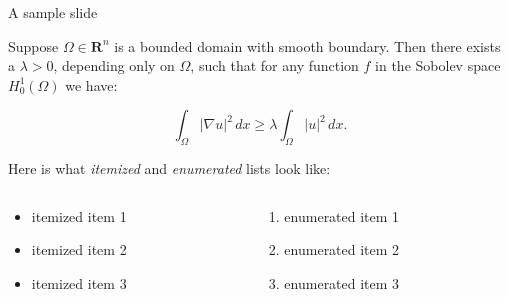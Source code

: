 \documentclass{beamer}
\begin{document}
\begin{frame}{A sample slide}

\begin{theorem}
Suppose $\Omega\in\mathbf{R}^n$ is a bounded domain with smooth
boundary.  Then there exists a $\lambda>0$, depending only on
$\Omega$, such that for any function $f$ in the Sobolev space
$H^1_0(\Omega)$ we have:

\[
  \int_\Omega |\nabla u|^2 \,dx \ge 
  \lambda \int_\Omega |u|^2 \,dx .
\]
\end{theorem}

Here is what \emph{itemized} and \emph{enumerated} lists look like:

\begin{columns}
  \begin{column}{0.45\textwidth}
  \begin{itemize}
    \item itemized item 1
    \item itemized item 2
    \item itemized item 3
  \end{itemize}
  \end{column}

  \begin{column}{0.45\textwidth}
  \begin{enumerate}
    \item enumerated item 1
    \item enumerated item 2
    \item enumerated item 3
  \end{enumerate}
  \end{column}
\end{columns}

\end{frame}
\end{document}
